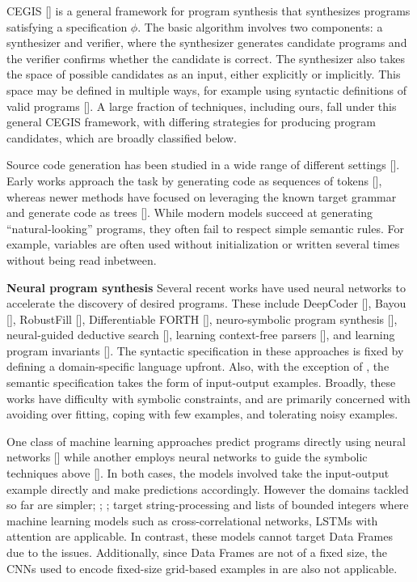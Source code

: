 \documentclass{article}
\begin{document}
CEGIS [\cite{SolarLezama2008}] is a general framework for program synthesis that synthesizes programs satisfying a specification $\phi$. The basic algorithm involves two components: a synthesizer and verifier, where the synthesizer generates candidate programs and the verifier confirms whether the candidate is correct. The synthesizer also takes the space of possible candidates as an input, either explicitly or implicitly. This space may be defined in multiple ways, for example using syntactic definitions of valid programs [\cite{Alur2013}]. A large fraction of techniques, including ours, fall under this general CEGIS framework, with differing strategies for producing program candidates, which are broadly classified below.

Source code generation has been studied in a wide range of different settings [\cite{allamanis2018survey}]. Early works approach the task by generating code as sequences of tokens [\cite{hindle2016CACM}], whereas newer methods have focused on leveraging the known target grammar and generate code as trees [\cite{Maddison2014}]. While modern models succeed at generating “natural-looking” programs, they often fail to respect simple semantic rules. For example, variables are often used without initialization or written several times without being read inbetween.

\textbf{Neural program synthesis}
Several recent works have used neural networks to accelerate the discovery of desired programs. These include DeepCoder [\cite{balog2017deepcoder}], Bayou [\cite{murali2018neural}], RobustFill [\cite{pmlr-v70-devlin17a}], Differentiable FORTH [\cite{bosnjak2017programming}], neuro-symbolic program synthesis [\cite{bunel2018leveraging}], neural-guided deductive search [\cite{kalyan2018neuralguided}], learning context-free parsers [\cite{chen2018synthesizing}], and learning program invariants [\cite{Si2018}]. The syntactic specification in these approaches is fixed by defining a domain-specific language upfront. Also, with the exception of \cite{Si2018}, the semantic specification takes the form of input-output examples. Broadly, these works have difficulty with symbolic constraints, and are primarily concerned with avoiding over fitting, coping with few examples, and tolerating noisy examples.

One class of machine learning approaches predict programs directly using neural networks [\cite{parisotto2017neuro-symbolic}] while another employs neural networks to guide the symbolic techniques above [\cite{kalyan2018}]. In both cases, the models involved take the input-output example directly and make predictions accordingly. However the domains tackled so far are simpler; \cite{balog2017deepcoder}; \cite{pmlr-v70-devlin17a}; \cite{kalyan2018} target string-processing and lists of bounded integers where machine learning models such as cross-correlational networks, LSTMs with attention are applicable. In contrast, these models cannot target Data Frames due to the issues. Additionally, since Data Frames are not of a fixed size, the CNNs used to encode fixed-size grid-based examples in \cite{bunel2018leveraging} are also not applicable.
\end{document}
